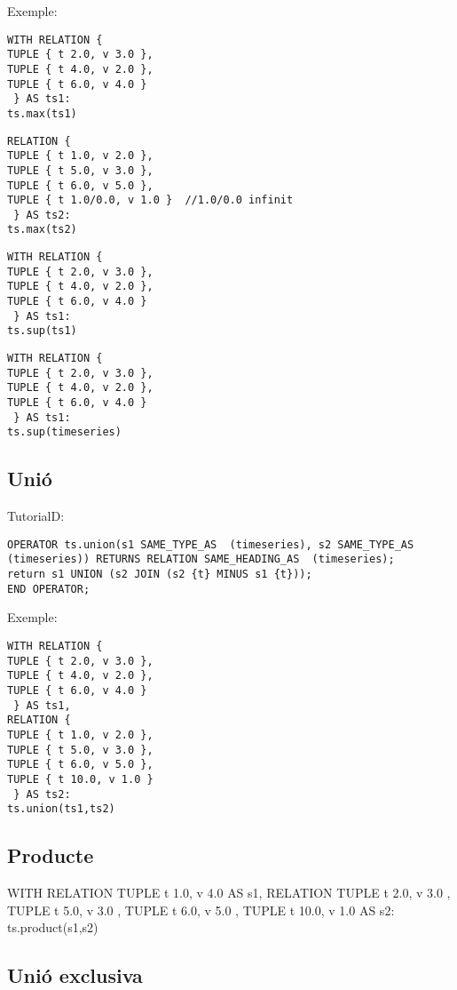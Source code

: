 Exemple:
\begin{verbatim}
WITH RELATION {
TUPLE { t 2.0, v 3.0 },
TUPLE { t 4.0, v 2.0 },
TUPLE { t 6.0, v 4.0 }
 } AS ts1: 
ts.max(ts1)
\end{verbatim}
\begin{verbatim}
RELATION {
TUPLE { t 1.0, v 2.0 },
TUPLE { t 5.0, v 3.0 },
TUPLE { t 6.0, v 5.0 },
TUPLE { t 1.0/0.0, v 1.0 }  //1.0/0.0 infinit
 } AS ts2: 
ts.max(ts2)
\end{verbatim}
\begin{verbatim}
WITH RELATION {
TUPLE { t 2.0, v 3.0 },
TUPLE { t 4.0, v 2.0 },
TUPLE { t 6.0, v 4.0 }
 } AS ts1: 
ts.sup(ts1)
\end{verbatim}
\begin{verbatim}
WITH RELATION {
TUPLE { t 2.0, v 3.0 },
TUPLE { t 4.0, v 2.0 },
TUPLE { t 6.0, v 4.0 }
 } AS ts1: 
ts.sup(timeseries)
\end{verbatim}



\subsection{Unió}

TutorialD:
\begin{verbatim}
OPERATOR ts.union(s1 SAME_TYPE_AS  (timeseries), s2 SAME_TYPE_AS  (timeseries)) RETURNS RELATION SAME_HEADING_AS  (timeseries);
return s1 UNION (s2 JOIN (s2 {t} MINUS s1 {t}));
END OPERATOR;
\end{verbatim}


Exemple:
\begin{verbatim}
WITH RELATION {
TUPLE { t 2.0, v 3.0 },
TUPLE { t 4.0, v 2.0 },
TUPLE { t 6.0, v 4.0 }
 } AS ts1,
RELATION {
TUPLE { t 1.0, v 2.0 },
TUPLE { t 5.0, v 3.0 },
TUPLE { t 6.0, v 5.0 },
TUPLE { t 10.0, v 1.0 }
 } AS ts2: 
ts.union(ts1,ts2)
\end{verbatim}



\subsection{Producte}

WITH RELATION {
TUPLE { t 1.0, v 4.0 }
 } AS s1,
RELATION {
TUPLE { t 2.0, v 3.0 },
TUPLE { t 5.0, v 3.0 },
TUPLE { t 6.0, v 5.0 },
TUPLE { t 10.0, v 1.0 }
 } AS s2: 
ts.product(s1,s2)


\subsection{Unió exclusiva}


